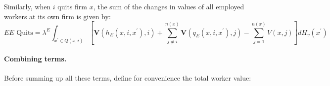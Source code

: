 Similarly, when $i$ quits firm $x$, the sum of the changes in values of all
employed workers at its own firm is given by:
\begin{equation*}
\text{$EE$ Quits}=\lambda ^{E}\int_{x^{\prime }\in Q\left( x,i\right) }\left[
\boldsymbol{V}\left( h_{E}\left( x,i,x^{\prime }\right) ,i\right) +\sum_{j\neq
i}^{n\left( x\right) }\boldsymbol{V}\left( q_{E}\left( x,i,x^{\prime }\right)
,j\right) -\sum_{j=1}^{n\left( x\right) }V\left( x,j\right) \right] dH_v\left(
x^{\prime }\right)
\end{equation*}

\paragraph{Combining terms.}

Before summing up all these terms, define for convenience the total worker value:
